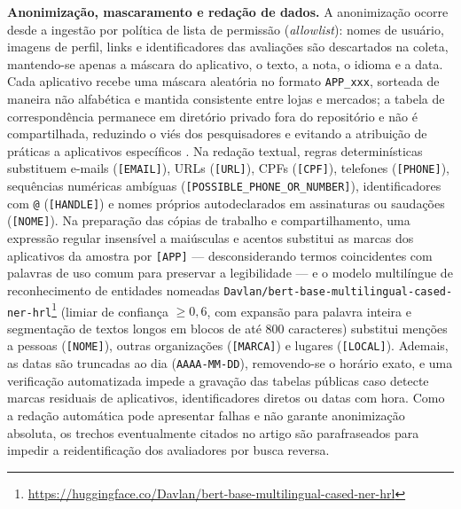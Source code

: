 \textbf{Anonimização, mascaramento e redação de dados.} A anonimização ocorre desde a ingestão por política de lista de permissão (\textit{allowlist}): nomes de usuário, imagens de perfil, links e identificadores das avaliações são descartados na coleta, mantendo-se apenas a máscara do aplicativo, o texto, a nota, o idioma e a data. Cada aplicativo recebe uma máscara aleatória no formato \texttt{APP\_xxx}, sorteada de maneira não alfabética e mantida consistente entre lojas e mercados; a tabela de correspondência permanece em diretório privado fora do repositório e não é compartilhada, reduzindo o viés dos pesquisadores e evitando a atribuição de práticas a aplicativos específicos \parencite{alsebayel2025}. Na redação textual, regras determinísticas substituem e-mails (\texttt{[EMAIL]}), URLs (\texttt{[URL]}), CPFs (\texttt{[CPF]}), telefones (\texttt{[PHONE]}), sequências numéricas ambíguas (\texttt{[POSSIBLE\_PHONE\_OR\_NUMBER]}), identificadores com \texttt{@} (\texttt{[HANDLE]}) e nomes próprios autodeclarados em assinaturas ou saudações (\texttt{[NOME]}). Na preparação das cópias de trabalho e compartilhamento, uma expressão regular insensível a maiúsculas e acentos substitui as marcas dos aplicativos da amostra por \texttt{[APP]} --- desconsiderando termos coincidentes com palavras de uso comum para preservar a legibilidade --- e o modelo multilíngue de reconhecimento de entidades nomeadas \texttt{Davlan/bert-base-multilingual-cased-ner-hrl}\footnote{\url{https://huggingface.co/Davlan/bert-base-multilingual-cased-ner-hrl}} (limiar de confiança $\ge 0{,}6$, com expansão para palavra inteira e segmentação de textos longos em blocos de até 800 caracteres) substitui menções a pessoas (\texttt{[NOME]}), outras organizações (\texttt{[MARCA]}) e lugares (\texttt{[LOCAL]}). Ademais, as datas são truncadas ao dia (\texttt{AAAA-MM-DD}), removendo-se o horário exato, e uma verificação automatizada impede a gravação das tabelas públicas caso detecte marcas residuais de aplicativos, identificadores diretos ou datas com hora. Como a redação automática pode apresentar falhas e não garante anonimização absoluta, os trechos eventualmente citados no artigo são parafraseados para impedir a reidentificação dos avaliadores por busca reversa.

